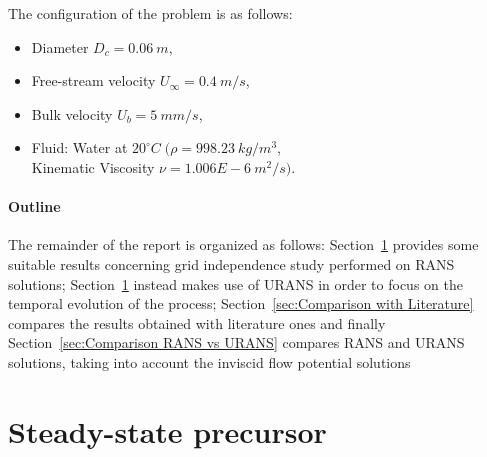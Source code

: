 \documentclass[12pt]{article}
\begin{document}
        The configuration of the problem is as follows:
        \begin{itemize}
                \item Diameter \( D_c = 0.06 \: m \),
                \item Free-stream velocity \( U_\infty = 0.4 \: m/s \),
                \item Bulk velocity \( U_b = 5 \: mm/s \),
                \item Fluid: Water at \( 20^{\circ}C \; ( \rho = 998.23 \: kg/m^3\), \\ Kinematic Viscosity \( \nu = 1.006E-6 \: m^2/s ) \).
        \end{itemize}


        \paragraph{Outline}
        The remainder of the report is organized as follows: Section~\ref{sec:Steady-state precursor} provides some suitable results concerning grid independence study performed on RANS solutions; Section~\ref{sec:Steady-state precursor} instead makes use of URANS in order to focus on the temporal evolution  of the process; Section~\ref{sec:Comparison with Literature} compares the results obtained with literature ones and finally  Section~\ref{sec:Comparison RANS vs URANS} compares RANS and URANS solutions, taking into account the inviscid flow potential solutions
        
      
      
\section{Steady-state precursor} \label{sec:Steady-state precursor}
\end{document}
